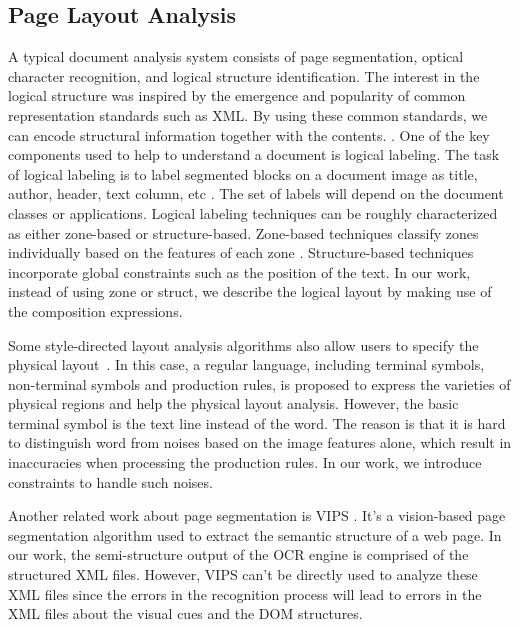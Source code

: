 \subsection{Page Layout Analysis}
A typical document analysis system consists of page segmentation,
optical character recognition, and logical structure identification.
The interest in the logical structure was inspired by the
emergence and popularity of common representation standards such as XML.
By using these common standards, we can encode structural information
together with the contents. \cite{o1993document}.
One of the key components used to help to understand a document is logical
labeling.
The task of logical labeling is to label segmented blocks on a document
image as title, author, header, text column, etc \cite{liang2002logical}.
The set of labels will depend on the document classes or applications.
Logical labeling techniques can be roughly characterized as either
zone-based or structure-based. Zone-based
techniques classify zones individually based on the features of each zone
\cite{altamura2001transforming} \cite{palmero1999structured}.
Structure-based techniques incorporate global constraints such as the position
of the text.
In our work, instead of using zone or struct,
we describe the logical layout by making
use of the composition expressions.

Some style-directed layout analysis algorithms
also allow users to specify the physical layout~\cite{kanungo2003stochastic}.
In this case, a regular language, including terminal symbols,
non-terminal symbols and production rules, is proposed to express
the varieties of physical regions and help the physical layout analysis.
However, the basic terminal symbol is the text line instead of the word.
The reason is that it is hard to distinguish word from noises based on the
image features alone, which result in inaccuracies when processing
the production rules. In our work, we introduce constraints to
handle such noises.

Another related work about page segmentation is VIPS \cite{cai2003vips}.
It's a vision-based page segmentation algorithm used to extract the semantic
structure of a web page.
In our work, the semi-structure output of the OCR engine is comprised of the
structured XML files. However, VIPS can't be directly used to analyze
these XML files since the errors in the recognition process will
lead to errors in the XML files about the visual cues
and the DOM structures.

